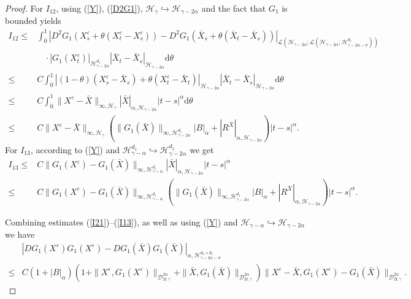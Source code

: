\documentclass[10pt,a4paper]{amsart}
\begin{document}
\begin{proof}
	For $I_{12}$, using (\ref{Y}), (\ref{D2G1}), $\mathcal H_{\gamma} \hookrightarrow \mathcal H_{\gamma-2\alpha}$ and the fact that $G_1$ is bounded yields
	\begin{align}\label{I12}
		I_{12} \leq & \int_0^1 |D^2 G_1 (X_s^\varepsilon+\theta(X_t^\varepsilon-X_s^\varepsilon))-D^2 G_1(\bar{X}_s+\theta(\bar{X}_t-\bar{X}_s))|_{\mathcal L (\mathcal H_{\gamma-2\alpha}; \mathcal L (\mathcal H_{\gamma-2\alpha}; \mathcal H_{\gamma-2\alpha-\sigma}^{d_1}))} \nonumber\\
		&~~~~ \cdot
		|G_1(X_t^\varepsilon)|_{\mathcal H_{\gamma-2\alpha}^{d_1}} |\bar{X}_t-\bar{X}_s|_{\mathcal H_{\gamma-2\alpha}} \mathrm{d} \theta \nonumber\\
		\leq & C \int_0^1 |(1-\theta)(X_s^\varepsilon-\bar{X}_s)+\theta (X_t^\varepsilon-\bar{X}_t)|_{\mathcal H_{\gamma-2\alpha}}   |\bar{X}_t-\bar{X}_s|_{\mathcal H_{\gamma-2\alpha}} \mathrm{d} \theta \nonumber\\
		\leq & C \int_0^1  \|X^\varepsilon-\bar{X}\|_{\infty, \mathcal H_\gamma}
		|\bar{X}|_{\alpha, \mathcal H_{\gamma-2\alpha}} |t-s|^\alpha \mathrm{d} \theta  \nonumber\\
		\leq & C \|X^\varepsilon-\bar{X}\|_{\infty, \mathcal H_\gamma} (\|G_1(\bar{X})\|_{\infty,\mathcal H_{\gamma-2\alpha}^{d_1}}|B|_\alpha+|R^{\bar{X}} |_{\alpha, \mathcal H_{\gamma-2\alpha}})  |t-s|^\alpha  .
	\end{align}	
	For $I_{13}$, according to (\ref{Y}) and $\mathcal H_{\gamma-\alpha}^{d_1} \hookrightarrow \mathcal H_{\gamma-2\alpha}^{d_1}$ we get
	\begin{align}\label{I13}
		I_{13}	
		\leq & C \|G_1(X^\varepsilon)-G_1(\bar{X})\|_{\infty,\mathcal H_{\gamma-\alpha}^{d_1}} |\bar{X}|_{\alpha,\mathcal H_{\gamma-2\alpha}} |t-s|^\alpha \nonumber\\
		\leq & C \|G_1(X^\varepsilon)-G_1(\bar{X})\|_{\infty,\mathcal H_{\gamma-\alpha}^ {d_1}} (\|G_1(\bar{X})\|_{\infty,\mathcal H_{\gamma-2\alpha}^{d_1}}|B|_\alpha+|R^{\bar{X}} |_{\alpha, \mathcal H_{\gamma-2\alpha}})  |t-s|^\alpha  .
	\end{align}
	
	
	Combining estimates (\ref{I21})--(\ref{I13}), as well as using (\ref{Y}) and $\mathcal H_{\gamma-\alpha} \hookrightarrow \mathcal H_{\gamma-2\alpha}$ we have
	\begin{align}\label{G3}
		&|DG_1(X^\varepsilon)G_1(X^\varepsilon)-DG_1(\bar{X})G_1(\bar{X})|_{\alpha, \mathcal H_{\gamma-2\alpha-\sigma}^{d_1 \times d_1}}  \nonumber\\
		\leq & C(1+|B|_\alpha) \left(1+\|X^\varepsilon,G_1(X^\varepsilon)\|_{\mathcal{D}_{ B,\gamma}^{2\alpha}} +\|\bar{X},G_1(\bar{X})\|_{\mathcal{D}_{ B,\gamma}^{2\alpha}} \right) \|X^\varepsilon-\bar{X},G_1(X^\varepsilon)-G_1(\bar{X})\|_{\mathcal{D}_{ B,\gamma}^{2\alpha}}  .
	\end{align}
	

\end{proof}
\end{document}
